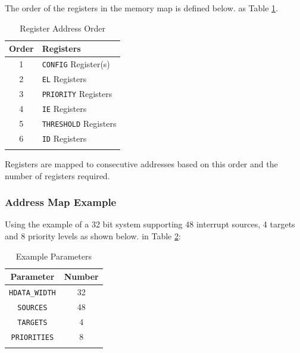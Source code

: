 %
%
%
%

The order of the registers in the memory map is defined 
\ifdefined\MARKDOWN
below.
\else
as Table \ref{tab:REGMAP}.
\fi

\begin{longtable}[]{@{}cl@{}}	
	\toprule 
	\textbf{Order} & \textbf{Registers}\\
	\midrule
	\endhead 
	1 & \texttt{CONFIG} Register(s)\\
	2 & \texttt{EL} Registers\\
	3 & \texttt{PRIORITY} Registers\\
	4 & \texttt{IE} Registers\\
	5 & \texttt{THRESHOLD} Registers\\
	6 & \texttt{ID} Registers\\
	\bottomrule 	
	\caption{Register Address Order}
	\label{tab:REGMAP}
\end{longtable}

Registers are mapped to consecutive addresses based on this order and the
number of registers required. 

\subsubsection{Address Map Example}

Using the example of a 32 bit system supporting 48 interrupt sources, 4 targets and 8 priority levels as shown 
\ifdefined\MARKDOWN
below.
\else
in Table \ref{tab:REGMAPEX}:
\fi

\begin{longtable}[c]{@{}cc@{}}	
		\toprule 
		\textbf{Parameter}    & \textbf{Number}\\
		\midrule 
		\endhead
		\texttt{HDATA\_WIDTH} & 32\\
		\texttt{SOURCES}      & 48\\
		\texttt{TARGETS}      & 4\\
		\texttt{PRIORITIES}   & 8\\
		\bottomrule 	
 
	\caption{Example Parameters}
	\label{tab:REGMAPEX}
\end{longtable}


